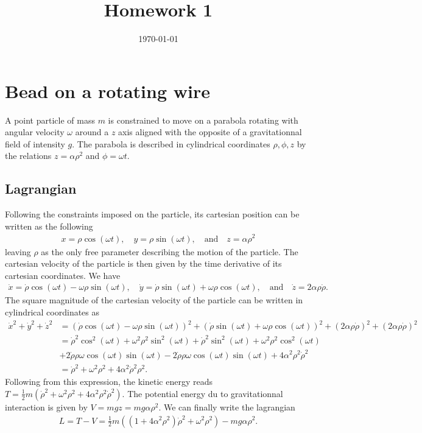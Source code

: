\documentclass[10pt, a4paper]{article}
\title{Homework 1} %
\author{\PA} %
\date{\today} %
\begin{document}
\maketitlepage

\maketableofcontents

\section{Bead on a rotating wire}
A point particle of mass $m$ is constrained to move on a parabola rotating with angular velocity $\omega$ around a $z$ axis aligned with the opposite of a gravitationnal field of intensity $g$. The parabola is described in cylindrical coordinates $\rho, \phi, z$ by the relations $z = \alpha \rho^2$ and $\phi = \omega t$. %
\subsection{Lagrangian}
Following the constraints imposed on the particle, its cartesian position can be written as the following
\begin{align*}
    x = \rho \cos(\omega t), \quad y = \rho \sin(\omega t), \quad \text{and} \quad z = \alpha\rho^2 
\end{align*}
leaving $\rho$ as the only free parameter describing the motion of the particle. The cartesian velocity of the particle is then given by the time derivative of its cartesian coordinates. We have 
\begin{align*}
    \dot{x} = \dot{\rho} \cos(\omega t) - \omega \rho \sin(\omega t), \quad \dot{y} = \dot{\rho} \sin(\omega t) + \omega \rho \cos(\omega t) , \quad \text{and} \quad \dot{z} = 2\alpha\rho \dot{\rho}.
\end{align*}
The square magnitude of the cartesian velocity of the particle can be written in cylindrical coordinates as 
\begin{align*}
    \dot{x}^2 + \dot{y}^2 + \dot{z}^2 &= \left(\dot{\rho} \cos(\omega t) - \omega \rho \sin(\omega t)\right)^2 + \left(\dot{\rho} \sin(\omega t) + \omega \rho \cos(\omega t)\right)^2 + \left(2\alpha\rho \dot{\rho}\right)^2 + (2\alpha\rho \dot{\rho})^2 \\ &=  \dot{\rho}^2 \cos^2(\omega t) + \omega^2 \rho^2 \sin^2(\omega t) + \dot{\rho}^2 \sin^2(\omega t) + \omega^2 \rho^2 \cos^2(\omega t) \\&+ 2\dot{\rho} \rho \omega \cos(\omega t) \sin(\omega t) - 2 \dot{\rho} \rho \omega \cos(\omega t) \sin(\omega t) + 4\alpha^2\rho^2 \dot{\rho}^2\\
    &= \dot{\rho}^2  +\omega^2 \rho^2 + 4\alpha^2 \dot{\rho}^2 \rho^2. 
\end{align*}
Following from this expression, the kinetic energy reads $T = \frac{1}{2}m \left(\dot{\rho}^2  + \omega^2 \rho^2 + 4\alpha^2 \rho^2 \dot{\rho}^2 \right)$.
The potential energy du to gravitationnal interaction is given by $V = mgz = mg \alpha \rho^2$. We can finally write the lagrangian 
\begin{align*}
    L = T - V =  \frac{1}{2}m \left(\left(1 + 4\alpha^2 \rho^2\right) \dot{\rho}^2  + \omega^2\rho^2 \right) - mg \alpha \rho^2.
\end{align*}
\end{document}
